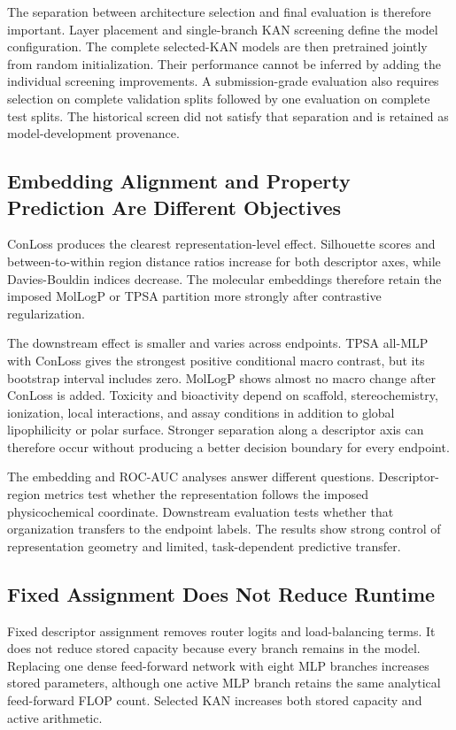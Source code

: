 \documentclass[journal=jcisd8,manuscript=article]{achemso}
\begin{document}
The separation between architecture selection and final evaluation is therefore important. Layer placement and single-branch KAN screening define the model configuration. The complete selected-KAN models are then pretrained jointly from random initialization. Their performance cannot be inferred by adding the individual screening improvements. A submission-grade evaluation also requires selection on complete validation splits followed by one evaluation on complete test splits. The historical screen did not satisfy that separation and is retained as model-development provenance.

\subsection{Embedding Alignment and Property Prediction Are Different Objectives}

ConLoss produces the clearest representation-level effect. Silhouette scores and between-to-within region distance ratios increase for both descriptor axes, while Davies-Bouldin indices decrease. The molecular embeddings therefore retain the imposed MolLogP or TPSA partition more strongly after contrastive regularization.

The downstream effect is smaller and varies across endpoints. TPSA all-MLP with ConLoss gives the strongest positive conditional macro contrast, but its bootstrap interval includes zero. MolLogP shows almost no macro change after ConLoss is added. Toxicity and bioactivity depend on scaffold, stereochemistry, ionization, local interactions, and assay conditions in addition to global lipophilicity or polar surface. Stronger separation along a descriptor axis can therefore occur without producing a better decision boundary for every endpoint.

The embedding and ROC-AUC analyses answer different questions. Descriptor-region metrics test whether the representation follows the imposed physicochemical coordinate. Downstream evaluation tests whether that organization transfers to the endpoint labels. The results show strong control of representation geometry and limited, task-dependent predictive transfer.

\subsection{Fixed Assignment Does Not Reduce Runtime}

Fixed descriptor assignment removes router logits and load-balancing terms. It does not reduce stored capacity because every branch remains in the model. Replacing one dense feed-forward network with eight MLP branches increases stored parameters, although one active MLP branch retains the same analytical feed-forward FLOP count. Selected KAN increases both stored capacity and active arithmetic.
\end{document}
